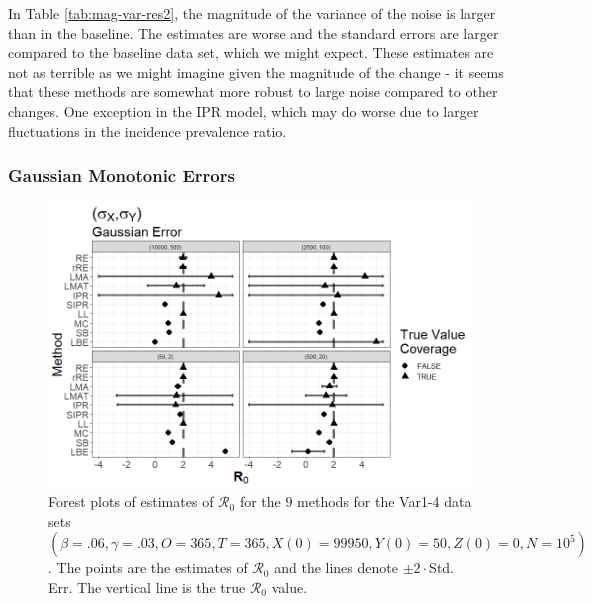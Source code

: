 \documentclass[12pt]{article}
\newcommand{\xxsir}{\ensuremath{9} } %
\newcommand{\rr}{\ensuremath{\mathcal{R}_0}}
\begin{document}
In Table \ref{tab:mag-var-res2}, the magnitude of the variance of the noise is larger than in the baseline. The estimates are worse and the standard errors are larger compared to the baseline data set, which we might expect. These estimates are not as terrible as we might imagine given the magnitude of the change - it seems that these methods are somewhat more robust to large noise compared to other changes. One exception in the IPR model, which may do worse due to larger fluctuations in the incidence prevalence ratio. 

\subsubsection{Gaussian Monotonic Errors}

\begin{figure}[H]
	\begin{center}
		\includegraphics[scale=0.5]{images/var_nm.tiff}
		\caption{Forest plots of estimates of $\rr$ for the \xxsir methods for the Var1-4 data sets $(\beta=.06, \gamma=.03, O=365, T=365, X(0)=99950, Y(0)=50, Z(0)=0, N=10^5)$.  The points are the estimates of $\rr$ and the lines denote $\pm 2\cdot $Std. Err.  The vertical line is the true $\rr$ value.}
	\end{center}
\end{figure}
\end{document}
